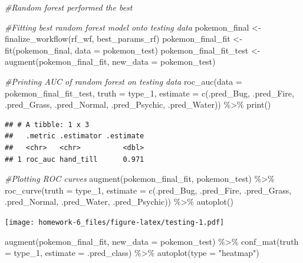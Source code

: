 \documentclass[
]{article}
\newenvironment{Shaded}{\begin{snugshade}}{\end{snugshade}}
\newcommand{\AttributeTok}[1]{\textcolor[rgb]{0.77,0.63,0.00}{#1}}
\newcommand{\CommentTok}[1]{\textcolor[rgb]{0.56,0.35,0.01}{\textit{#1}}}
\newcommand{\FunctionTok}[1]{\textcolor[rgb]{0.00,0.00,0.00}{#1}}
\newcommand{\NormalTok}[1]{#1}
\newcommand{\OtherTok}[1]{\textcolor[rgb]{0.56,0.35,0.01}{#1}}
\newcommand{\SpecialCharTok}[1]{\textcolor[rgb]{0.00,0.00,0.00}{#1}}
\newcommand{\StringTok}[1]{\textcolor[rgb]{0.31,0.60,0.02}{#1}}
\begin{document}
\begin{Shaded}
\begin{Highlighting}[]
\CommentTok{\#Random forest performed the best}

\CommentTok{\#Fitting best random forest model onto testing data}
\NormalTok{pokemon\_final }\OtherTok{\textless{}{-}} \FunctionTok{finalize\_workflow}\NormalTok{(rf\_wf, best\_params\_rf)}
\NormalTok{pokemon\_final\_fit }\OtherTok{\textless{}{-}} \FunctionTok{fit}\NormalTok{(pokemon\_final, }\AttributeTok{data =}\NormalTok{ pokemon\_test)}
\NormalTok{pokemon\_final\_fit\_test }\OtherTok{\textless{}{-}} \FunctionTok{augment}\NormalTok{(pokemon\_final\_fit, }\AttributeTok{new\_data =}\NormalTok{ pokemon\_test)}

\CommentTok{\#Printing AUC of random forest on testing data}
\FunctionTok{roc\_auc}\NormalTok{(}\AttributeTok{data =}\NormalTok{ pokemon\_final\_fit\_test, }\AttributeTok{truth =}\NormalTok{ type\_1, }\AttributeTok{estimate =} \FunctionTok{c}\NormalTok{(.pred\_Bug, .pred\_Fire, .pred\_Grass, .pred\_Normal, .pred\_Psychic, .pred\_Water)) }\SpecialCharTok{\%\textgreater{}\%} \FunctionTok{print}\NormalTok{()}
\end{Highlighting}
\end{Shaded}

\begin{verbatim}
## # A tibble: 1 x 3
##   .metric .estimator .estimate
##   <chr>   <chr>          <dbl>
## 1 roc_auc hand_till      0.971
\end{verbatim}

\begin{Shaded}
\begin{Highlighting}[]
\CommentTok{\#Plotting ROC curves}
\FunctionTok{augment}\NormalTok{(pokemon\_final\_fit, pokemon\_test) }\SpecialCharTok{\%\textgreater{}\%} \FunctionTok{roc\_curve}\NormalTok{(}\AttributeTok{truth =}\NormalTok{ type\_1, }\AttributeTok{estimate =} \FunctionTok{c}\NormalTok{(.pred\_Bug, .pred\_Fire, .pred\_Grass, .pred\_Normal, .pred\_Water, .pred\_Psychic)) }\SpecialCharTok{\%\textgreater{}\%} \FunctionTok{autoplot}\NormalTok{()}
\end{Highlighting}
\end{Shaded}

\texttt{[image: homework-6\_files/figure-latex/testing-1.pdf]}

\begin{Shaded}
\begin{Highlighting}[]
\FunctionTok{augment}\NormalTok{(pokemon\_final\_fit, }\AttributeTok{new\_data =}\NormalTok{ pokemon\_test) }\SpecialCharTok{\%\textgreater{}\%}
  \FunctionTok{conf\_mat}\NormalTok{(}\AttributeTok{truth =}\NormalTok{ type\_1, }\AttributeTok{estimate =}\NormalTok{ .pred\_class) }\SpecialCharTok{\%\textgreater{}\%} 
  \FunctionTok{autoplot}\NormalTok{(}\AttributeTok{type =} \StringTok{"heatmap"}\NormalTok{)}
\end{Highlighting}
\end{Shaded}
\end{document}
